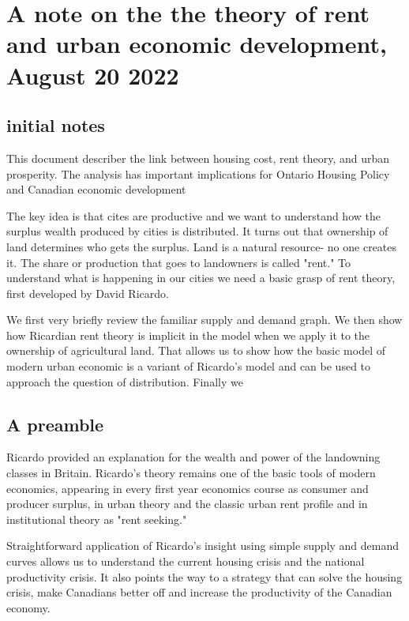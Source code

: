
\chapter{A note on the the theory of rent and urban economic development, August 20 2022}\section{initial notes}

This document describer the link between housing cost, rent theory, and urban prosperity. The analysis has important implications for Ontario Housing Policy and Canadian economic development

The key idea is that cites are productive and we want to understand how the surplus wealth produced by cities is distributed.  It turns out that ownership of land determines  who gets the surplus. Land is a natural resource- no one creates it. The share or production that goes to landowners is called "rent." To  understand what is happening in our cities we need a basic grasp of  rent theory, first developed by David Ricardo. 

We first very briefly review the familiar supply and demand graph. We then show how Ricardian rent theory is implicit in the model when we apply it to  the ownership of agricultural land. That allows us to show how the basic model of modern urban economic is a variant of Ricardo's model and can be used to approach the question of distribution. Finally we 

\section{A preamble}
Ricardo provided an explanation for the wealth and power of the landowning classes in Britain. Ricardo's theory remains one of the basic tools of modern economics, appearing in every first year economics course as consumer and producer surplus, in urban theory and the classic urban rent profile and in institutional theory as  "rent seeking."

Straightforward application of Ricardo's insight using simple supply and demand curves allows us to understand the current housing crisis and the national productivity crisis. It also points the way to a strategy that can solve the housing crisis, make Canadians better off and increase the productivity of the Canadian economy.

